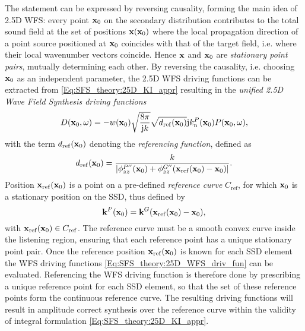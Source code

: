The statement can be expressed by reversing causality, forming the main idea of 2.5D WFS: 
every point $\mathbf{x}_0$ on the secondary distribution contributes to the total sound field at the set of positions $\mathbf{x}(\mathbf{x}_0)$ where the local propagation direction of a point source positioned at $\mathbf{x}_0$ coincides with that of the target field, i.e. where their local wavenumber vectors coincide.
Hence $\mathbf{x}$ and $\mathbf{x}_0$ are \emph{stationary point pairs}, mutually determining each other.
By reversing the causality, i.e. choosing $\mathbf{x}_0$ as an independent parameter, the 2.5D WFS driving functions can be extracted from \eqref{Eq:SFS_theory:25D_KI_appr} resulting in the \emph{unified 2.5D Wave Field Synthesis driving functions}
\begin{equation}
D(\mathbf{x}_0, \omega) = -w(\mathbf{x}_0) 
\sqrt{\frac{8\pi}{\mathrm{j} k}}\sqrt{d_{\mathrm{ref}}(\mathbf{x}_0)}
\mathrm{j} k_{\mathrm{n}}^P(\mathbf{x}_0) 	P(\mathbf{x}_0,\omega),
\label{Eq:SFS_theory:25D_WFS_driv_fun}
\end{equation}
with the term $d_{\mathrm{ref}}(\mathbf{x}_0)$ denoting the \emph{referencing function}, defined as
\begin{equation}
d_{\mathrm{ref}}(\mathbf{x}_0) = \frac{k}{|\phi^{P''}_{zz}(\mathbf{x}_0) +\phi^{G''}_{zz}(\mathbf{x}_{\mathrm{ref}}(\mathbf{x}_0)-\mathbf{x}_0)|}.
\end{equation}
Position $\mathbf{x}_{\mathrm{ref}}(\mathbf{x}_0)$ is a point on a pre-defined \emph{reference curve} $C_{\mathrm{ref}}$, for which $\mathbf{x}_0$ is a stationary position on the SSD, thus defined by
\begin{equation}
\mathbf{k}^P(\mathbf{x}_0) = \mathbf{k}^G(\mathbf{x}_{\mathrm{ref}}(\mathbf{x}_0) - \mathbf{x}_0),
\label{Eq:SFS_theory:WFS_General_Stat_pos}
\end{equation}
with $\mathbf{x}_{\mathrm{ref}}(\mathbf{x}_0) \in C_{\mathrm{ref}}$.
The reference curve must be a smooth convex curve inside the listening region, ensuring that each reference point has a unique stationary point pair.
Once the reference position $\mathbf{x}_{\mathrm{ref}}(\mathbf{x}_0)$ is known for each SSD element the WFS driving functions \eqref{Eq:SFS_theory:25D_WFS_driv_fun} can be evaluated.
Referencing the WFS driving function is therefore done by prescribing a unique reference point for each SSD element, so that the set of these reference points form the continuous reference curve.
The resulting driving functions will result in amplitude correct synthesis over the reference curve within the validity of integral formulation \eqref{Eq:SFS_theory:25D_KI_appr}.

